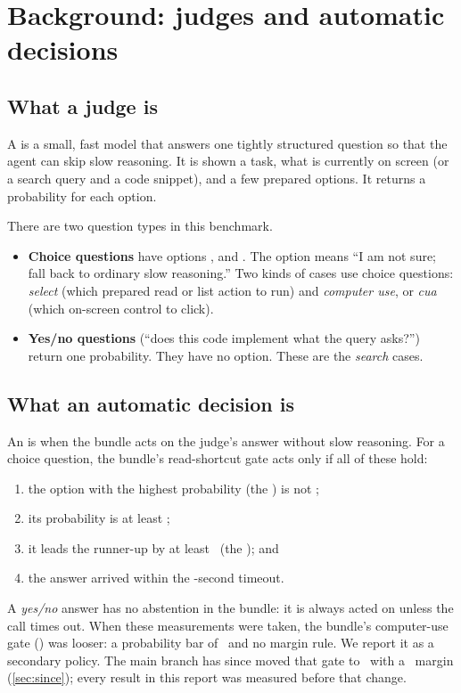 \section{Background: judges and automatic decisions}\label{sec:background}

\subsection{What a judge is}

A  is a small, fast model that answers one tightly structured question so that the agent can
skip slow reasoning. It is shown a task, what is currently on screen (or a search query and a code
snippet), and a few prepared options. It returns a probability for each option.

There are two question types in this benchmark.
\begin{itemize}
  \item \textbf{Choice questions} have options ,  and . The option
     means ``I am not sure; fall back to ordinary slow reasoning.'' Two kinds of cases use
    choice questions: \emph{select} (which prepared read or list action to run) and \emph{computer use},
    or \emph{cua} (which on-screen control to click).
  \item \textbf{Yes/no questions} (``does this code implement what the query asks?'') return one
    probability. They have no  option. These are the \emph{search} cases.
\end{itemize}

\subsection{What an automatic decision is}

An  is when the bundle acts on the judge's answer without slow reasoning.
For a choice question, the bundle's read-shortcut gate acts only if all of these hold:
\begin{enumerate}
  \item the option with the highest probability (the ) is not ;
  \item its probability is at least \MinP;
  \item it leads the runner-up by at least \MinMargin\ (the ); and
  \item the answer arrived within the \TimeoutS-second timeout.
\end{enumerate}
A \emph{yes/no} answer has no abstention in the bundle: it is always acted on unless the call times
out. When these measurements were taken, the bundle's computer-use gate () was looser:
a probability bar of \CuaMinP\ and no margin rule. We report it as a secondary policy. The main
branch has since moved that gate to \MinP\ with a \MinMargin\ margin (\cref{sec:since}); every result
in this report was measured before that change.

